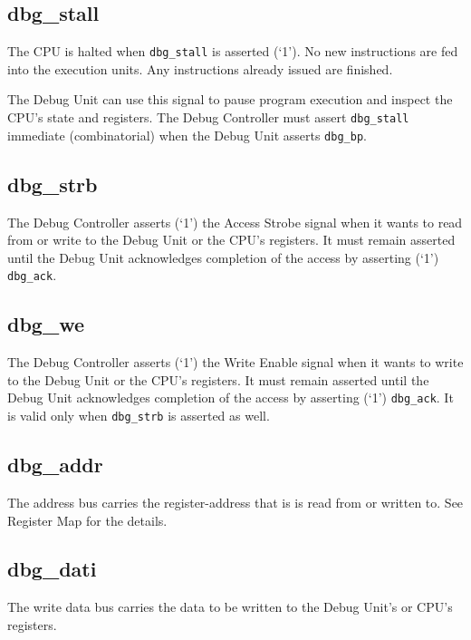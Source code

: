 \subsection{dbg\_stall}\label{dbg_stall}

The CPU is halted when \texttt{dbg\_stall} is asserted (`1'). No new instructions
are fed into the execution units. Any instructions already issued are
finished.

The Debug Unit can use this signal to pause program execution and
inspect the CPU's state and registers. The Debug Controller must assert
\texttt{dbg\_stall} immediate (combinatorial) when the Debug Unit asserts
\texttt{dbg\_bp}.

\subsection{dbg\_strb}\label{dbg_strb}

The Debug Controller asserts (`1') the Access Strobe signal when it
wants to read from or write to the Debug Unit or the CPU's registers. It
must remain asserted until the Debug Unit acknowledges completion of the
access by asserting (`1') \texttt{dbg\_ack}.

\subsection{dbg\_we}\label{dbg_we}

The Debug Controller asserts (`1') the Write Enable signal when it wants
to write to the Debug Unit or the CPU's registers. It must remain
asserted until the Debug Unit acknowledges completion of the access by
asserting (`1') \texttt{dbg\_ack}. It is valid only when \texttt{dbg\_strb} is asserted as
well.

\subsection{dbg\_addr}\label{dbg_addr}

The address bus carries the register-address that is is read from or
written to. See Register Map for the details.

\subsection{dbg\_dati}\label{dbg_dati}

The write data bus carries the data to be written to the Debug Unit's or
CPU's registers.

